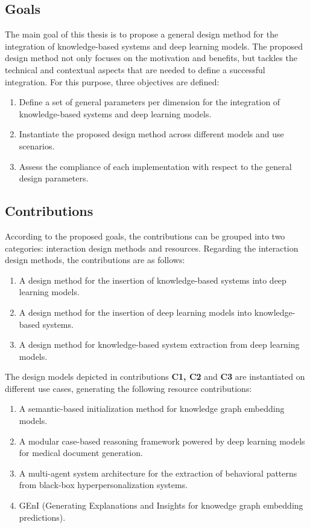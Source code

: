 \subsection{Goals}
The main goal of this thesis is to propose a general design method for the integration of knowledge-based systems and deep learning models.  The proposed design method not only focuses on the motivation and benefits, but tackles the technical and contextual aspects that are needed to define a successful integration. For this purpose, three objectives are defined:
\begin{enumerate}[start=1,label={\bfseries O\arabic*:}]
    \item Define a set of general parameters per dimension for the integration of knowledge-based systems and deep learning models.
    \item Instantiate the proposed design method across different models and use scenarios.
    \item Assess the compliance of each implementation with respect to the general design parameters. 
\end{enumerate}

\subsection{Contributions}
According to the proposed goals, the contributions can be grouped into two categories: interaction design methods and resources.
Regarding the interaction design methods, the contributions are as follows:
\begin{enumerate}[start=1,label={\bfseries C\arabic*:}]
    \item A design method for the insertion of knowledge-based systems into deep learning models.
    \item A design method for the insertion of deep learning models into knowledge-based systems.
    \item A design method for knowledge-based system extraction from deep learning models.
\end{enumerate}
The design models depicted in contributions \textbf{C1, C2} and \textbf{C3} are instantiated on different use cases, generating the following resource contributions:
\begin{enumerate}[start=4,label={\bfseries C\arabic*:}]
    \item A semantic-based initialization method for knowledge graph embedding models.
    \item A modular case-based reasoning framework powered by deep learning models for medical document generation.
    \item A multi-agent system architecture for the extraction of behavioral patterns from black-box hyperpersonalization systems.
    \item GEnI (Generating Explanations and Insights for knowedge graph embedding predictions).
\end{enumerate}


